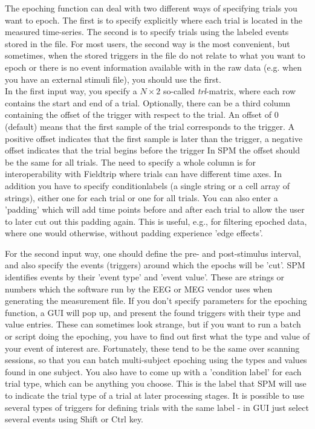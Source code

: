 The epoching function can deal with two different ways of specifying trials 
you want to epoch. The first is to specify explicitly where each trial is located 
in the measured time-series. The second is to specify trials using the labeled events
stored in the file. For most users, the second way is the most convenient, but sometimes, when
the stored triggers in the file do not relate to what you want to epoch or there is no event
information available with in the raw data (e.g. when you have an external stimuli file),
you should use the first. 
\\
In the first input way, you specify a $N \times 2$ so-called \textit{trl}-matrix, where
each row contains the start and end of a trial. Optionally, there can be a third column 
containing the offset of the trigger with respect to the trial. An offset of 0 (default)
means that the first sample of the trial corresponds to the trigger. A positive offset indicates
that the first sample is later than the trigger, a negative offset indicates that the trial begins before the trigger
In SPM the offset should be the same for all trials. The need to specify a whole column is for interoperability
with Fieldtrip where trials can have different time axes. In addition you have to specify conditionlabels (a single string or a cell array
of strings), either one for each trial or one for all trials. You can also enter a 'padding' which will add time points before and after each 
trial to allow the user to later cut out this padding again. This is useful, e.g., for filtering epoched
data, where one would otherwise, without padding experience 'edge effects'. 

For the second input way, one should define the pre- and post-stimulus interval, and also specify
the events (triggers) around which the epochs will be 'cut'. SPM identifies events by their 'event type' and 
'event value'. These are strings or numbers 
which the software run by the EEG or MEG vendor uses when generating the measurement file. 
If you don't specify parameters for the epoching function, a GUI will pop up, and present
the found triggers with their type and value entries. These can sometimes look strange, 
but if you want to run a batch or script doing the epoching, you have to find out first what
the type and value of your event of interest are. Fortunately, these tend to be the same over scanning sessions, 
so that you can batch multi-subject epoching using the types and values found in one subject. 
You also have to come up with a 'condition label' for each trial type, which can be anything 
you choose. This is the label that SPM will use to indicate the trial type of a trial at later
processing stages. It is possible to use several types of triggers for defining trials with the
same label - in GUI just select several events using Shift or Ctrl key.

